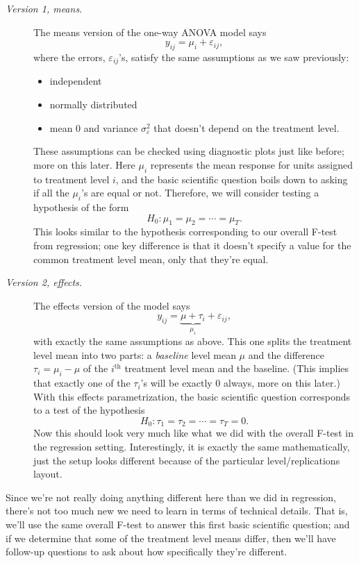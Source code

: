 \documentclass[a4paper, 12pt]{article}
\theoremstyle{plain}
\theoremstyle{definition}
\theoremstyle{remark}
\newcommand{\eps}{\varepsilon}
\begin{document}
\begin{description}
\item[\it Version 1, means.] The means version of the one-way ANOVA model says 
\[ y_{ij} = \mu_i + \eps_{ij}, \]
where the errors, $\eps_{ij}$'s, satisfy the same assumptions as we saw previously:
\begin{itemize}
\item independent
\item normally distributed
\item mean 0 and variance $\sigma_\eps^2$ that doesn't depend on the treatment level.
\end{itemize}
These assumptions can be checked using diagnostic plots just like before; more on this later.  Here $\mu_i$ represents the mean response for units assigned to treatment level $i$, and the basic scientific question boils down to asking if all the $\mu_i$'s are equal or not.  Therefore, we will consider testing a hypothesis of the form
\[ H_0: \mu_1 = \mu_2 = \cdots = \mu_T. \]
This looks similar to the hypothesis corresponding to our overall F-test from regression; one key difference is that it doesn't specify a value for the common treatment level mean, only that they're equal.  
\item[\it Version 2, effects.] The effects version of the model says 
\[ y_{ij} = \underbrace{\mu + \tau_i}_{\mu_i} + \eps_{ij}, \]
with exactly the same assumptions as above.  This one splits the treatment level mean into two parts: a {\em baseline} level mean $\mu$ and the difference $\tau_i = \mu_i - \mu$ of the $i^\text{th}$ treatment level mean and the baseline.  (This implies that exactly one of the $\tau_i$'s will be exactly 0 always, more on this later.)  With this effects parametrization, the basic scientific question corresponds to a test of the hypothesis 
\[ H_0: \tau_1 = \tau_2 = \cdots = \tau_T = 0. \]
Now this should look very much like what we did with the overall F-test in the regression setting.  Interestingly, it is exactly the same mathematically, just the setup looks different because of the particular level/replications layout.  
\end{description}

Since we're not really doing anything different here than we did in regression, there's not too much new we need to learn in terms of technical details.  That is, we'll use the same overall F-test to answer this first basic scientific question; and if we determine that some of the treatment level means differ, then we'll have follow-up questions to ask about how specifically they're different.  
\end{document}

